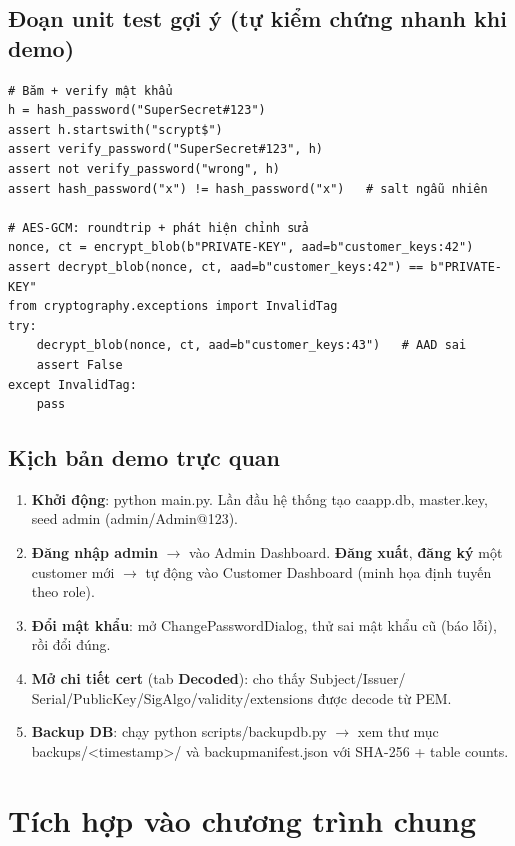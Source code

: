 \documentclass[12pt,a4paper]{article}
\newcommand{\code}[1]{{\ttfamily\small\def\_{\textunderscore\discretionary{}{}{}}#1}}
\begin{document}
\subsection{Đoạn unit test gợi ý (tự kiểm chứng nhanh khi demo)}

\begin{Verbatim}
# Băm + verify mật khẩu
h = hash_password("SuperSecret#123")
assert h.startswith("scrypt$")
assert verify_password("SuperSecret#123", h)
assert not verify_password("wrong", h)
assert hash_password("x") != hash_password("x")   # salt ngẫu nhiên

# AES-GCM: roundtrip + phát hiện chỉnh sửa
nonce, ct = encrypt_blob(b"PRIVATE-KEY", aad=b"customer_keys:42")
assert decrypt_blob(nonce, ct, aad=b"customer_keys:42") == b"PRIVATE-KEY"
from cryptography.exceptions import InvalidTag
try:
    decrypt_blob(nonce, ct, aad=b"customer_keys:43")   # AAD sai
    assert False
except InvalidTag:
    pass
\end{Verbatim}

\subsection{Kịch bản demo trực quan}

\begin{enumerate}
  \item \textbf{Khởi động}: \code{python main.py}. Lần đầu hệ thống tạo
        \code{ca\_app.db}, \code{master.key}, seed admin (\code{admin/Admin@123}).
  \item \textbf{Đăng nhập admin} $\to$ vào Admin Dashboard. \textbf{Đăng xuất},
        \textbf{đăng ký} một customer mới $\to$ tự động vào Customer Dashboard
        (minh họa định tuyến theo role).
  \item \textbf{Đổi mật khẩu}: mở \code{ChangePasswordDialog}, thử sai mật khẩu cũ
        (báo lỗi), rồi đổi đúng.
  \item \textbf{Mở chi tiết cert} (tab \textbf{Decoded}): cho thấy Subject/Issuer/
        Serial/PublicKey/SigAlgo/validity/extensions được decode từ PEM.
  \item \textbf{Backup DB}: chạy \code{python scripts/backup\_db.py} $\to$ xem
        thư mục \code{backups/<timestamp>/} và \code{backup\_manifest.json} với
        SHA-256 + table counts.
\end{enumerate}

\section{Tích hợp vào chương trình chung}
\end{document}
